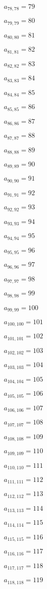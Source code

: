 \documentclass[a4paper,12pt]{article}
\begin{document}
$a _{ 78, 78 } = 79$

$a _{ 79, 79 } = 80$

$a _{ 80, 80 } = 81$

$a _{ 81, 81 } = 82$

$a _{ 82, 82 } = 83$

$a _{ 83, 83 } = 84$

$a _{ 84, 84 } = 85$

$a _{ 85, 85 } = 86$

$a _{ 86, 86 } = 87$

$a _{ 87, 87 } = 88$

$a _{ 88, 88 } = 89$

$a _{ 89, 89 } = 90$

$a _{ 90, 90 } = 91$

$a _{ 91, 91 } = 92$

$a _{ 92, 92 } = 93$

$a _{ 93, 93 } = 94$

$a _{ 94, 94 } = 95$

$a _{ 95, 95 } = 96$

$a _{ 96, 96 } = 97$

$a _{ 97, 97 } = 98$

$a _{ 98, 98 } = 99$

$a _{ 99, 99 } = 100$

$a _{ 100, 100 } = 101$

$a _{ 101, 101 } = 102$

$a _{ 102, 102 } = 103$

$a _{ 103, 103 } = 104$

$a _{ 104, 104 } = 105$

$a _{ 105, 105 } = 106$

$a _{ 106, 106 } = 107$

$a _{ 107, 107 } = 108$

$a _{ 108, 108 } = 109$

$a _{ 109, 109 } = 110$

$a _{ 110, 110 } = 111$

$a _{ 111, 111 } = 112$

$a _{ 112, 112 } = 113$

$a _{ 113, 113 } = 114$

$a _{ 114, 114 } = 115$

$a _{ 115, 115 } = 116$

$a _{ 116, 116 } = 117$

$a _{ 117, 117 } = 118$

$a _{ 118, 118 } = 119$
\end{document}
